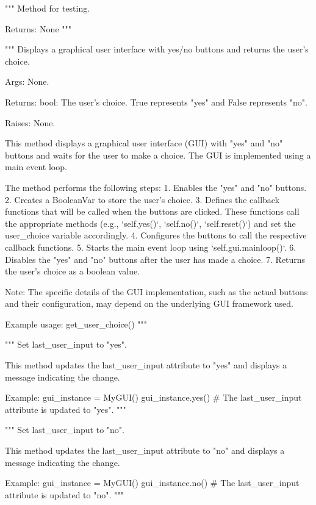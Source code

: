 \begin{codebox}
"""
Method for testing.

Returns:
    None
"""
\end{codebox}

\begin{codebox}
"""
Displays a graphical user interface with yes/no buttons and returns the user's choice.

Args:
    None.

Returns:
    bool: The user's choice. True represents "yes" and False represents "no".

Raises:
    None.

This method displays a graphical user interface (GUI) with "yes" and "no" buttons and waits for the user to make a choice.
The GUI is implemented using a main event loop.

The method performs the following steps:
	1. Enables the "yes" and "no" buttons.
	2. Creates a BooleanVar to store the user's choice.
	3. Defines the callback functions that will be called when the buttons are clicked. These functions call the appropriate
	   methods (e.g., `self.yes()`, `self.no()`, `self.reset()`) and set the user_choice variable accordingly.
	4. Configures the buttons to call the respective callback functions.
	5. Starts the main event loop using `self.gui.mainloop()`.
	6. Disables the "yes" and "no" buttons after the user has made a choice.
	7. Returns the user's choice as a boolean value.

Note: The specific details of the GUI implementation, such as the actual buttons and their configuration, may depend on
the underlying GUI framework used.

Example usage:
    get_user_choice()
"""
\end{codebox}

\begin{codebox}
"""
Set last_user_input to "yes".

This method updates the last_user_input attribute to "yes" and displays a message indicating the change.

Example:
    gui_instance = MyGUI()
    gui_instance.yes()
    # The last_user_input attribute is updated to "yes".
"""
\end{codebox}

\begin{codebox}
"""
Set last_user_input to "no".

This method updates the last_user_input attribute to "no" and displays a message indicating the change.

Example:
    gui_instance = MyGUI()
    gui_instance.no()
    # The last_user_input attribute is updated to "no".
"""
\end{codebox}

